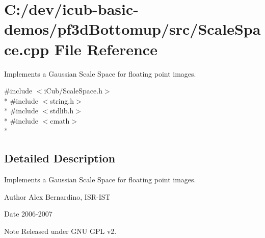 \section{C\+:/dev/icub-\/basic-\/demos/pf3d\+Bottomup/src/\+Scale\+Space.cpp File Reference}
\label{ScaleSpace_8cpp}


Implements a Gaussian Scale Space for floating point images.  


{\ttfamily \#include $<$i\+Cub/\+Scale\+Space.\+h$>$}\\*
{\ttfamily \#include $<$string.\+h$>$}\\*
{\ttfamily \#include $<$stdlib.\+h$>$}\\*
{\ttfamily \#include $<$cmath$>$}\\*


\subsection{Detailed Description}
Implements a Gaussian Scale Space for floating point images. 

\begin{DoxyAuthor}{Author}
Alex Bernardino, I\+S\+R-\/\+I\+ST 
\end{DoxyAuthor}
\begin{DoxyDate}{Date}
2006-\/2007 
\end{DoxyDate}
\begin{DoxyNote}{Note}
Released under G\+NU G\+PL v2. 
\end{DoxyNote}
